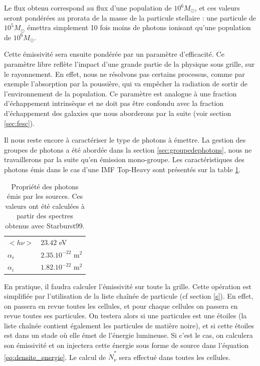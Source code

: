 Le flux obtenu correspond au flux d'une population de $10^6M_\odot$, et ces valeurs seront pondérées au prorata de la masse de la particule stellaire : une particule de $10^5M_\odot$ émettra  simplement 10 fois moins de photons ionisant qu'une population de $10^6 M_\odot$.

Cette émissivité sera ensuite pondérée par un paramètre d'efficacité.
Ce paramètre libre reflète l'impact d'une grande partie de la physique sous grille, sur le rayonnement.
En effet, nous ne résolvons pas certains processus, comme par exemple l'absorption par la poussière, qui va empêcher la radiation de sortir de l’environnement de la population.
Ce paramètre est analogue à une fraction d'échappement intrinsèque et ne doit pas être confondu avec la fraction d'échappement des galaxies que nous aborderons par la suite (voir section \ref{sec:fesc}).

Il nous reste encore à caractériser le type de photons à émettre.
La gestion des groupes de photons a été abordée dans la section \ref{sec:groupedephotons}, nous ne travaillerons par la suite qu'en émission mono-groupe.
Les caractéristiques des photons émis dans le cas d'une \ac{IMF} Top-Heavy sont présentés sur la table \ref{tab_photon}.

\begin{table}
\begin{tabular}{l l }
	$<h\nu>$	&  $23.42$ eV \\
	$\alpha_e$	&  $2.35.10^{-22}$ m$^2$ \\
	$\alpha_i$	&  $1.82.10^{-22}$ m$^2$ \\
\end{tabular}
\caption[Propriété des photons]{Propriété des photons émis par les sources.
Ces valeurs ont été calculées à partir des spectres obtenus avec Starburst99.
\label{tab_photon}}
\end{table}


En pratique, il faudra calculer l'émissivité sur toute la grille.
Cette opération est simplifiée par l'utilisation de la liste chaînée de particule (cf section \ref{s}).
En effet, on passera en revue toutes les cellules, et pour chaque cellules on passera en revue toutes ses particules.
On testera alors si une particules est une étoiles (la liste chaînée contient également les particules de matière noire), et si cette étoiles est dans un stade où elle émet de l'énergie lumineuse.
Si c'est le cas, on calculera son émissivité et on injectera cette énergie sous forme de source dans l'équation \ref{eq:densite_energie}.
Le calcul de $\dot{N}_\nu^*$ sera effectué dans toutes les cellules.

